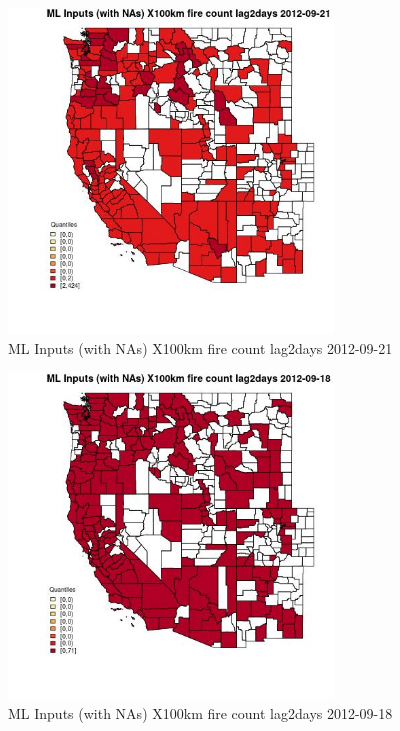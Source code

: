 \begin{figure} 
\centering  
\includegraphics[width=0.77\textwidth]{Code_Outputs/Report_ML_input_PM25_Step4_part_e_de_duplicated_aves_compiled_2019-05-14wNAs_CountyX100km_fire_count_lag2daysMean2012-09-21_2012-09-21.jpg} 
\caption{\label{fig:Report_ML_input_PM25_Step4_part_e_de_duplicated_aves_compiled_2019-05-14wNAsCountyX100km_fire_count_lag2daysMean2012-09-21_2012-09-21}ML Inputs (with NAs) X100km fire count lag2days 2012-09-21} 
\end{figure} 
 

\begin{figure} 
\centering  
\includegraphics[width=0.77\textwidth]{Code_Outputs/Report_ML_input_PM25_Step4_part_e_de_duplicated_aves_compiled_2019-05-14wNAs_CountyX100km_fire_count_lag2daysMean2012-09-18_2012-09-18.jpg} 
\caption{\label{fig:Report_ML_input_PM25_Step4_part_e_de_duplicated_aves_compiled_2019-05-14wNAsCountyX100km_fire_count_lag2daysMean2012-09-18_2012-09-18}ML Inputs (with NAs) X100km fire count lag2days 2012-09-18} 
\end{figure} 
 

